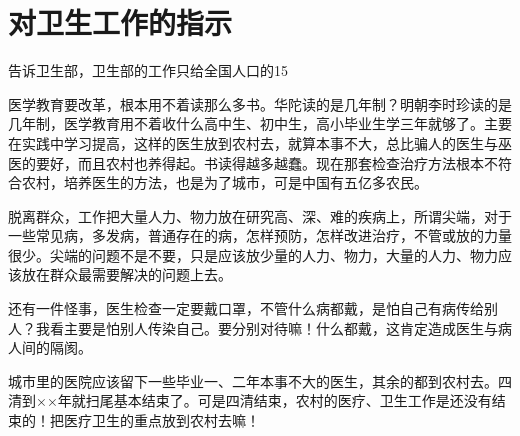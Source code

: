 \section[对卫生工作的指示（一九六五年六月二十六日）]{对卫生工作的指示}


告诉卫生部，卫生部的工作只给全国人口的15%

医学教育要改革，根本用不着读那么多书。华陀读的是几年制？明朝李时珍读的是几年制，医学教育用不着收什么高中生、初中生，高小毕业生学三年就够了。主要在实践中学习提高，这样的医生放到农村去，就算本事不大，总比骗人的医生与巫医的要好，而且农村也养得起。书读得越多越蠢。现在那套检查治疗方法根本不符合农村，培养医生的方法，也是为了城市，可是中国有五亿多农民。

脱离群众，工作把大量人力、物力放在研究高、深、难的疾病上，所谓尖端，对于一些常见病，多发病，普通存在的病，怎样预防，怎样改进治疗，不管或放的力量很少。尖端的问题不是不要，只是应该放少量的人力、物力，大量的人力、物力应该放在群众最需要解决的问题上去。

还有一件怪事，医生检查一定要戴口罩，不管什么病都戴，是怕自己有病传给别人？我看主要是怕别人传染自己。要分别对待嘛！什么都戴，这肯定造成医生与病人间的隔阂。

城市里的医院应该留下一些毕业一、二年本事不大的医生，其余的都到农村去。四清到××年就扫尾基本结束了。可是四清结束，农村的医疗、卫生工作是还没有结束的！把医疗卫生的重点放到农村去嘛！

